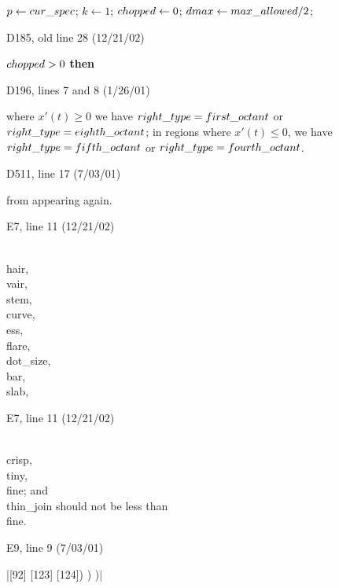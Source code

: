 {\ninepoint\noindent
\quad$p\gets\\{cur\_spec}$; $k\gets1$; $\\{chopped}\gets0$;
 $\\{dmax}\gets\\{max\_allowed}/2$;

\bugonpage D185, old line 28 (12/21/02)

\ninepoint\noindent
{} $\\{chopped}>0$ {\bf then}

\bugonpage D196, lines 7 and 8 (1/26/01)

\tenpoint\noindent
where $x'(t)\ge0$ we have $\\{right\_type}=%
\\{first\_octant}$ or $\\{right\_type}=\\{eighth\_octant}$; in regions where
$x'(t)\le0$,
we have $\\{right\_type}=\\{fifth\_octant}$ or $\\{right\_type}=\\{fourth%
\_octant}$.

\bugonpage D511, line 17 (7/03/01)

\tenpoint\noindent
from appearing again.

\hsize=29pc

\bugonpage E7, line 11 (12/21/02)

\ninepoint\indent
\\{hair}, \\{vair}, \\{stem}, \\{curve}, \\{ess}, \\{flare}, \\{dot\_size},
 \\{bar}, \\{slab},

\bugonpage E7, line 11 (12/21/02)

\ninepoint\indent
\\{crisp}, \\{tiny}, \\{fine};
\medskip\noindent
and \\{thin\_join} should not be less than \\{fine}.

\bugonpage E9, line 9 (7/03/01)

\tenpoint\indent
|[92] [123] [124]) ) )|

}
